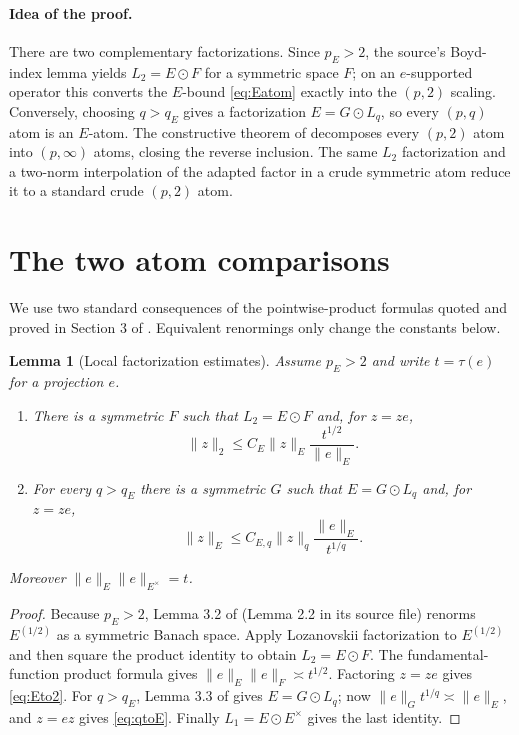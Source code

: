 \documentclass[11pt]{article}
\newtheorem{lemma}[theorem]{Lemma}
\newcommand{\tr}{\tau}
\begin{document}
\paragraph{Idea of the proof.}
There are two complementary factorizations.  Since $p_E>2$, the source's
Boyd-index lemma yields $L_2=E\odot F$ for a symmetric space $F$; on an
$e$-supported operator this converts the $E$-bound \eqref{eq:Eatom} exactly
into the $(p,2)$ scaling.  Conversely, choosing $q>q_E$ gives a factorization
$E=G\odot L_q$, so every $(p,q)$ atom is an $E$-atom.  The constructive theorem
of \cite{CRX} decomposes every $(p,2)$ atom into $(p,\infty)$ atoms, closing the
reverse inclusion.  The same $L_2$ factorization and a two-norm interpolation
of the adapted factor in a crude symmetric atom reduce it to a standard crude
$(p,2)$ atom.

\section{The two atom comparisons}

We use two standard consequences of the pointwise-product formulas quoted and
proved in Section 3 of \cite{HMW}.  Equivalent renormings only change the
constants below.

\begin{lemma}[Local factorization estimates]\label{lem:local}
Assume $p_E>2$ and write $t=\tr(e)$ for a projection $e$.
\begin{enumerate}
\item There is a symmetric $F$ such that $L_2=E\odot F$ and, for $z=ze$,
\begin{equation}\label{eq:Eto2}
 \|z\|_2\le C_E\|z\|_E\frac{t^{1/2}}{\|e\|_E}.
\end{equation}
\item For every $q>q_E$ there is a symmetric $G$ such that
$E=G\odot L_q$ and, for $z=ze$,
\begin{equation}\label{eq:qtoE}
 \|z\|_E\le C_{E,q}\|z\|_q\frac{\|e\|_E}{t^{1/q}}.
\end{equation}
\end{enumerate}
Moreover $\|e\|_E\|e\|_{E^\times}=t$.
\end{lemma}

\begin{proof}
Because $p_E>2$, Lemma 3.2 of \cite{HMW} (Lemma 2.2 in its source file)
renorms $E^{(1/2)}$ as a symmetric Banach space.  Apply Lozanovskii
factorization to $E^{(1/2)}$ and then square the product identity to obtain
$L_2=E\odot F$.  The fundamental-function product formula gives
$\|e\|_E\|e\|_F\asymp t^{1/2}$.  Factoring $z=ze$ gives
\eqref{eq:Eto2}.  For $q>q_E$, Lemma 3.3 of \cite{HMW} gives
$E=G\odot L_q$; now
$\|e\|_G t^{1/q}\asymp\|e\|_E$, and $z=ez$ gives
\eqref{eq:qtoE}.  Finally $L_1=E\odot E^\times$ gives the last identity.
\end{proof}
\end{document}
